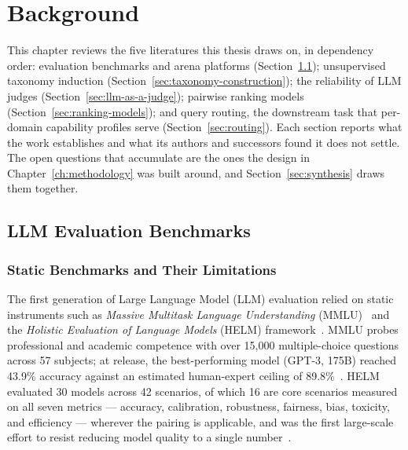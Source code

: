 \chapter{Background}\label{ch:literature-review}

This chapter reviews the five literatures this thesis draws on, in
dependency order: evaluation benchmarks and arena platforms
(Section~\ref{sec:benchmarks}); unsupervised taxonomy induction
(Section~\ref{sec:taxonomy-construction}); the reliability of LLM
judges (Section~\ref{sec:llm-as-a-judge}); pairwise ranking models
(Section~\ref{sec:ranking-models}); and query routing, the downstream
task that per-domain capability profiles serve
(Section~\ref{sec:routing}). Each section reports what the work
establishes and what its authors and successors found it does not
settle. The open questions that accumulate are the ones the design in
Chapter~\ref{ch:methodology} was built around, and
Section~\ref{sec:synthesis} draws them together.


\section{LLM Evaluation Benchmarks}\label{sec:benchmarks}

\subsection*{Static Benchmarks and Their Limitations}

The first generation of Large Language Model (LLM) evaluation relied
on static instruments such as \textit{Massive Multitask Language
Understanding} (MMLU)~\parencite{hendrycks2021measuring} and the
\textit{Holistic Evaluation of Language Models} (HELM)
framework~\parencite{liang2022holistic}. MMLU probes professional and
academic competence with over 15{,}000 multiple-choice questions
across 57 subjects; at release, the best-performing model (GPT-3,
175B) reached 43.9\% accuracy against an estimated human-expert
ceiling of 89.8\%~\parencite{hendrycks2021measuring}. HELM evaluated
30 models across 42 scenarios, of which 16 are core scenarios
measured on all seven metrics --- accuracy, calibration, robustness,
fairness, bias, toxicity, and efficiency --- wherever the pairing is
applicable, and was the first large-scale effort to resist reducing
model quality to a single number~\parencite{liang2022holistic}.

